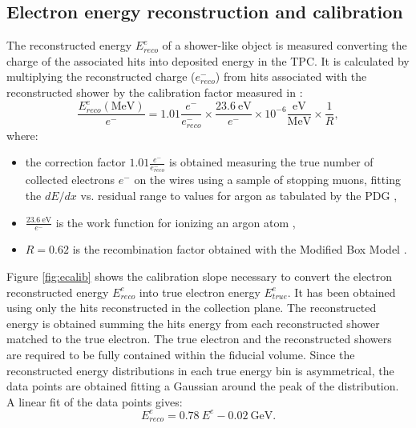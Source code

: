 \subsection{Electron energy reconstruction and calibration}\label{sec:showerenergy}
The reconstructed energy $E_{reco}^{e}$ of a shower-like object is measured converting the charge of the associated hits into deposited energy in the TPC. It is calculated by multiplying the reconstructed charge ($e^{-}_{reco}$) from hits associated with the reconstructed shower by the calibration factor measured in \cite{michel}:
\begin{equation}
\frac{E_{reco}^{e} \mathrm{(MeV)}}{e^-} = 1.01\frac{e^-}{e^{-}_{reco}} \times \frac{23.6~\mathrm{eV}}{e^-} \times 10^{-6} \frac{\mathrm{eV}}{\mathrm{MeV}} \times \frac{1}{R},\label{eq:calib}
\end{equation}
where:
\begin{itemize}

\item the correction factor $1.01\frac{e^-}{e^{-}_{reco}}$ is obtained measuring the true number of collected electrons $e^{-}$ on the wires using a sample of stopping muons, fitting the $dE/dx$ vs. residual range to values for argon as tabulated by the PDG \cite{pdg},
\item $\frac{23.6~\mathrm{eV}}{e^-}$ is the work function for ionizing an argon atom \cite{workfunction},
\item $R = 0.62$ is the recombination factor obtained with the Modified Box Model \cite{boxmodel}.
\end{itemize}
Figure \ref{fig:ecalib} shows the calibration slope necessary to convert the electron reconstructed energy $E_{reco}^{e}$ into true electron energy $E_{true}^{e}$. It has been obtained using only the hits reconstructed in the collection plane. 
The reconstructed energy is obtained summing the hits energy from each reconstructed shower matched to the true electron. The true electron and the reconstructed showers are required to be fully contained within the fiducial volume. Since the reconstructed energy distributions in each true energy bin is asymmetrical, the data points are obtained fitting a Gaussian around the peak of the distribution.
A linear fit of the data points gives:
\begin{equation}
E_{reco}^{e} = 0.78~E^{e} - 0.02~\mathrm{GeV}.
\end{equation}

